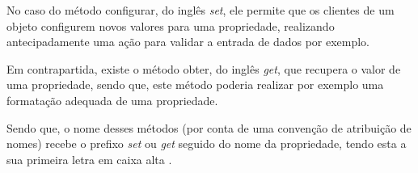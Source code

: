 No caso do método configurar, do inglês \textit{set}, ele permite que os
clientes de um objeto configurem novos valores para uma propriedade, realizando
antecipadamente uma ação para validar a entrada de dados por exemplo.

Em contrapartida, existe o método obter, do inglês \textit{get}, que recupera o
valor de uma propriedade, sendo que, este método poderia realizar por exemplo uma
formatação adequada de uma propriedade.

Sendo que, o nome desses métodos (por conta de uma convenção de atribuição de
nomes) recebe o prefixo \textit{set} ou \textit{get} seguido do nome da
propriedade, tendo esta a sua primeira letra em caixa alta \cite{javaComoProgramar}.